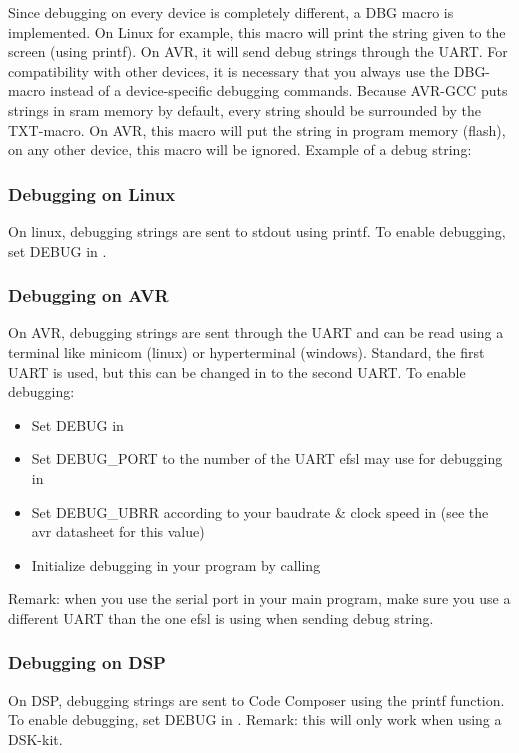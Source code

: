 Since debugging on every device is completely different, a DBG macro is
implemented. On Linux for example, this macro will print the string given
to the screen (using printf). On AVR, it will send debug strings through the
UART. For compatibility with other devices, it is necessary that you always use
the DBG-macro instead of a device-specific debugging commands.\newline
\newline
Because AVR-GCC puts strings in sram memory by default, every string should be
surrounded by the TXT-macro. On AVR, this macro will put the string in program
memory (flash), on any other device, this macro will be ignored.\newline
\newline
Example of a debug string:\\

\subsubsection{Debugging on Linux}
On linux, debugging strings are sent to stdout using printf.\newline
\newline
To enable debugging, set DEBUG in .
\subsubsection{Debugging on AVR}
On AVR, debugging strings are sent through the UART and can be read using
a terminal like minicom (linux) or hyperterminal (windows). Standard, the
first UART is used, but this can be changed in  to the
second UART.\newline
\newline
To enable debugging:
\begin{itemize}
	\item{Set DEBUG in }
	\item{Set DEBUG\_PORT to the number of the UART efsl may use for debugging
		in }
	\item{Set DEBUG\_UBRR according to your baudrate \& clock speed in
		 (see the avr datasheet for this value)}
	\item{Initialize debugging in your program by calling }
\end{itemize}
Remark: when you use the serial port in your main program, make sure you
use a different UART than the one efsl is using when sending debug string.
\subsubsection{Debugging on DSP}
On DSP, debugging strings are sent to Code Composer using the printf function.
\newline\newline
To enable debugging, set DEBUG in .\newline
\newline
Remark: this will only work when using a DSK-kit.
